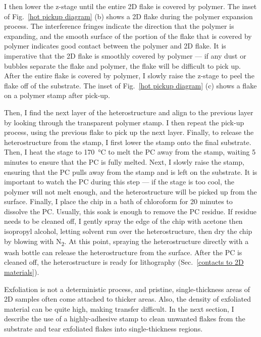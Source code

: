 \documentclass{beavtex_dub_edit}
\begin{document}
I then lower the z-stage until the entire 2D flake is covered by polymer. The inset of Fig.\ \ref{hot pickup diagram} (b) shows a 2D flake during the polymer expansion process. The interference fringes indicate the direction that the polymer is expanding, and the smooth surface of the portion of the flake that is covered by polymer indicates good contact between the polymer and 2D flake. It is imperative that the 2D flake is smoothly covered by polymer — if any dust or bubbles separate the flake and polymer, the flake will be difficult to pick up. After the entire flake is covered by polymer, I slowly raise the z-stage to peel the flake off of the substrate. The inset of Fig.\ \ref{hot pickup diagram} (c) shows a flake on a polymer stamp after pick-up.

Then, I find the next layer of the heterostructure and align to the previous layer by looking through the transparent polymer stamp. I then repeat the pick-up process, using the previous flake to pick up the next layer. Finally, to release the heterostructure from the stamp, I first lower the stamp onto the final substrate. Then, I heat the stage to \SI{170}{\celsius} to melt the PC away from the stamp, waiting 5 minutes to ensure that the PC is fully melted. Next, I slowly raise the stamp, ensuring that the PC pulls away from the stamp and is left on the substrate. It is important to watch the PC during this step — if the stage is too cool, the polymer will not melt enough, and the heterostructure will be picked up from the surface. Finally, I place the chip in a bath of chloroform for 20 minutes to dissolve the PC. Usually, this soak is enough to remove the PC residue. If residue needs to be cleaned off, I gently spray the edge of the chip with acetone then isopropyl alcohol, letting solvent run over the heterostructure, then dry the chip by blowing with N\textsubscript{2}. At this point, spraying the heterostructure directly with a wash bottle can release the heterostructure from the surface. After the PC is cleaned off, the heterostructure is ready for lithography (Sec.\ \ref{contacts to 2D materials}).

Exfoliation is not a deterministic process, and pristine, single-thickness areas of 2D samples often come attached to thicker areas. Also, the density of exfoliated material can be quite high, making transfer difficult. In the next section, I describe the use of a highly-adhesive stamp to clean unwanted flakes from the substrate and tear exfoliated flakes into single-thickness regions.
\end{document}
